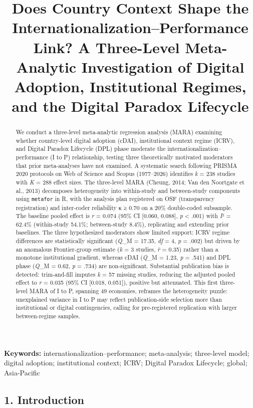 \documentclass[
  12pt,a4paper]{article}
\title{Does Country Context Shape the Internationalization--Performance
Link? A Three-Level Meta-Analytic Investigation of Digital Adoption,
Institutional Regimes, and the Digital Paradox Lifecycle}
\author{}
\date{}
\begin{document}
\maketitle
\begin{abstract}
We conduct a three-level meta-analytic regression analysis (MARA)
examining whether country-level digital adoption (cDAI), institutional
context regime (ICRV), and Digital Paradox Lifecycle (DPL) phase
moderate the internationalization--performance (I to P) relationship,
testing three theoretically motivated moderators that prior
meta-analyses have not examined. A systematic search following PRISMA
2020 protocols on Web of Science and Scopus (1977--2026) identifies
\emph{k} = 238 studies with \emph{K} = 288 effect sizes. The three-level
MARA (Cheung, 2014; Van den Noortgate et al., 2013) decomposes
heterogeneity into within-study and between-study components using
\texttt{metafor} in R, with the analysis plan registered on OSF
(transparency registration) and inter-coder reliability κ ≥ 0.70 on a
20\% double-coded subsample. The baseline pooled effect is \emph{r} =
0.074 (95\% CI {[}0.060, 0.088{]}, \emph{p} \textless{} .001) with
\emph{I}² = 62.4\% (within-study 54.1\%; between-study 8.4\%),
replicating and extending prior baselines. The three hypothesized
moderators show limited support: ICRV regime differences are
statistically significant (\emph{Q}\_M = 17.35, \emph{df} = 4, \emph{p}
= .002) but driven by an anomalous Frontier-group estimate (\emph{k} = 3
studies, \emph{r̄} = 0.35) rather than a monotone institutional gradient,
whereas cDAI (\emph{Q}\_M = 1.23, \emph{p} = .541) and DPL phase
(\emph{Q}\_M = 0.62, \emph{p} = .734) are non-significant. Substantial
publication bias is detected: trim-and-fill imputes \emph{k} = 57
missing studies, reducing the adjusted pooled effect to \emph{r} = 0.035
(95\% CI {[}0.018, 0.051{]}), positive but attenuated. This first
three-level MARA of I to P, spanning 49 economies, reframes the
heterogeneity puzzle: unexplained variance in I to P may reflect
publication-side selection more than institutional or digital
contingencies, calling for pre-registered replication with larger
between-regime samples.
\end{abstract}

\textbf{Keywords:} internationalization--performance; meta-analysis;
three-level model; digital adoption; institutional context; ICRV;
Digital Paradox Lifecycle; global; Asia-Pacific

\hypertarget{introduction}{%
\subsection{1. Introduction}\label{introduction}}
\end{document}
